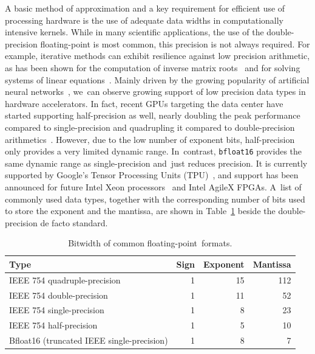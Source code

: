 \documentclass[computation,article,accept,moreauthors,pdftex]{Definitions/mdpi}
\begin{document}
A basic method of approximation and a key requirement for efficient use of processing hardware is the use of adequate data widths in computationally intensive kernels. While in many scientific applications, the use of the double-precision floating-point is most common, this precision is not always required.
For example, iterative methods can exhibit resilience against low precision arithmetic, as has been shown for the computation of inverse matrix roots~\cite{lass17-esl} and for solving systems of linear equations~\cite{KlavikMalossiBekasEtAl2014,Bekas,Dongarra2017,Dongarra2018}.
Mainly driven by the growing popularity of artificial neural networks~\cite{Gupta2015}, we~can observe growing support of low precision data types
in hardware accelerators.
In fact, recent GPUs targeting the data center have started supporting half-precision as well, nearly doubling the peak performance compared to single-precision and quadrupling it compared to double-precision arithmetics~\cite{tesla}. However, due to the low number of exponent bits, half-precision only provides a very limited dynamic range. In~contrast, \texttt{bfloat16}%
 provides the same dynamic range as single-precision and~just reduces precision. It is currently supported by Google's Tensor Processing Units (TPU)~\cite{tpu}, and support has been announced for future Intel Xeon processors~\cite{xeon} and Intel AgileX FPGAs. A~list of commonly used data types, together with the corresponding number of bits used to store the exponent and the mantissa, are shown in Table~\ref{tab:float} beside the double-precision {de facto} standard. 

\begin{table}[H]
 \caption{Bitwidth of common floating-point~formats.}
 \centering
 \label{tab:float}
 \begin{tabular}{lrrr}
 \toprule
 \textbf{Type} & \textbf{Sign} & \textbf{Exponent} & \textbf{Mantissa} \\
 \midrule
 IEEE 754 quadruple-precision & 1 & 15 & 112 \\
 IEEE 754 double-precision & 1 & 11 & 52 \\
 IEEE 754 single-precision & 1 & 8 & 23 \\
 IEEE 754 half-precision & 1 & 5 & 10 \\
 Bfloat16%
 (truncated IEEE single-precision) & 1 & 8 & 7\\
 \bottomrule
 \end{tabular}
\end{table}
\end{document}
